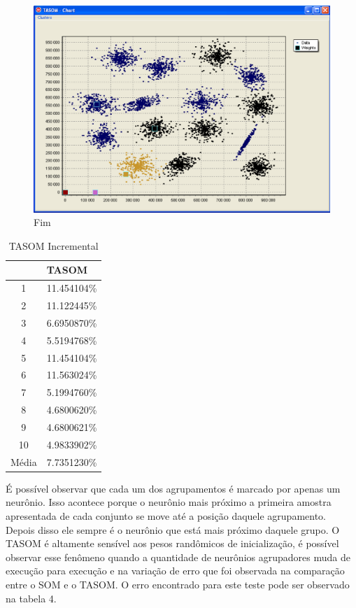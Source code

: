 \begin{figure}[!h]
\centering
\includegraphics[keepaspectratio=true,scale=0.5]
{figuras/tsom3.eps}
\caption{Fim}
\label{data_titatic}
\end{figure}

\begin{table}[h]
\centering
\caption{TASOM Incremental}
\label{my-label}
\begin{tabular}{c|l|}
\cline{2-2}
                            & TASOM      \\ \hline
\multicolumn{1}{|c|}{1}     & 11.454104\%  \\ \hline
\multicolumn{1}{|c|}{2}     & 11.122445\%  \\ \hline
\multicolumn{1}{|c|}{3}     & 6.6950870\%  \\ \hline
\multicolumn{1}{|c|}{4}     & 5.5194768\%  \\ \hline
\multicolumn{1}{|c|}{5}     & 11.454104\%  \\ \hline
\multicolumn{1}{|c|}{6}     & 11.563024\% \\ \hline
\multicolumn{1}{|c|}{7}     & 5.1994760\%  \\ \hline
\multicolumn{1}{|c|}{8}     & 4.6800620\%  \\ \hline
\multicolumn{1}{|c|}{9}     & 4.6800621\%  \\ \hline
\multicolumn{1}{|c|}{10}    & 4.9833902\%   \\ \hline
\multicolumn{1}{|l|}{Média} & 7.7351230\% \\ \hline
\end{tabular}
\end{table} 

É possível observar que cada um dos agrupamentos é marcado por apenas um neurônio. Isso acontece porque o neurônio mais próximo a primeira amostra apresentada de cada conjunto se move até a posição daquele agrupamento. Depois disso ele sempre é o neurônio que está mais próximo daquele grupo. O TASOM é altamente sensível aos pesos randômicos de inicialização, é possível observar esse fenômeno quando a quantidade de neurônios agrupadores muda de execução para execução e na variação de erro que foi observada na comparação entre o SOM e o TASOM. O erro encontrado para este teste pode ser observado na tabela 4.

